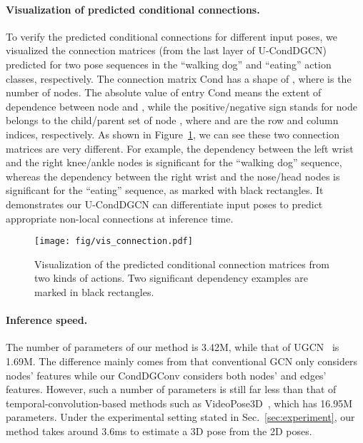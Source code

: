 \documentclass[sigconf]{acmart}
\begin{document}
\paragraph{Visualization of predicted conditional connections.}
To verify the predicted conditional connections for different input poses, we visualized the connection matrices (from the last layer of U-CondDGCN) predicted for two pose sequences in the ``walking dog'' and ``eating'' action classes, respectively.
The connection matrix Cond has a shape of , where  is the number of nodes.
The absolute value of entry Cond means the extent of dependence between node  and , while the positive/negative sign stands for node  belongs to the child/parent set of node , where  and  are the row and column indices, respectively.
As shown in Figure~\ref{fig: vis_map}, we can see these two connection matrices are very different.
For example, the dependency between the left wrist and the right knee/ankle nodes is significant for the ``walking dog'' sequence, whereas the dependency between the right wrist and the nose/head nodes is significant for the ``eating'' sequence, as marked with black rectangles. 
It demonstrates our U-CondDGCN can differentiate input poses to predict appropriate non-local connections at inference time.




\begin{figure}[!t] 
	\centering
	\texttt{[image: fig/vis\_connection.pdf]}
	\vspace{-3mm}
	\caption{
		Visualization of the predicted conditional connection matrices from two kinds of actions. Two significant dependency examples are marked in black rectangles.
	}
	\vspace{-4mm}
	\label{fig: vis_map}
\end{figure} 
\vspace{-1mm}
\paragraph{Inference speed.}
The number of parameters of our method is 3.42M, while that of UGCN~\cite{wang2020motion} is 1.69M. The difference mainly comes from that conventional GCN only considers nodes’ features while our CondDGConv considers both nodes’ and edges’ features. However, such a number of parameters is still far less than that of temporal-convolution-based methods such as VideoPose3D~\cite{pavllo20193d}, which has 16.95M parameters.
Under the experimental setting stated in Sec.~\ref{sec:experiment}, our method takes around 3.6ms to estimate a 3D pose from the 2D poses.
\end{document}
